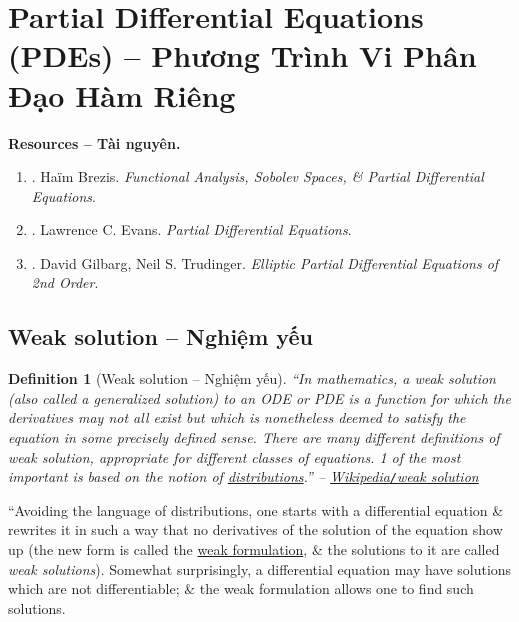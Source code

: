 \documentclass{article}
\newtheorem{definition}{Definition}
\begin{document}

\section{Partial Differential Equations (PDEs) -- Phương Trình Vi Phân Đạo Hàm Riêng}
\textbf{\textsf{Resources -- Tài nguyên.}}
\begin{enumerate}
	\item \cite{Brezis2011}. {\sc Ha\"im Brezis}. {\it Functional Analysis, Sobolev Spaces, \& Partial Differential Equations}.
	\item \cite{Evans2010}. {\sc Lawrence C. Evans}. {\it Partial Differential Equations}.
	\item \cite{Gilbarg_Trudinger2001}. {\sc David Gilbarg, Neil S. Trudinger}. {\it Elliptic Partial Differential Equations of 2nd Order}.
\end{enumerate}


\subsection{Weak solution -- Nghiệm yếu}

\begin{definition}[Weak solution -- Nghiệm yếu]
	``In mathematics, a \emph{weak solution} (also called a \emph{generalized solution}) to an ODE or PDE is a function for which the derivatives may not all exist but which is nonetheless deemed to satisfy the equation in some precisely defined sense. There are many different definitions of weak solution, appropriate for different classes of equations. 1 of the most important is based on the notion of \href{https://en.wikipedia.org/wiki/Distribution_(mathematics)}{distributions}.'' -- \href{https://en.wikipedia.org/wiki/Weak_solution}{Wikipedia{\tt/}weak solution}
\end{definition}
``Avoiding the language of distributions, one starts with a differential equation \& rewrites it in such a way that no derivatives of the solution of the equation show up (the new form is called the \href{https://en.wikipedia.org/wiki/Weak_formulation}{weak formulation}, \& the solutions to it are called {\it weak solutions}). Somewhat surprisingly, a differential equation may have solutions which are not differentiable; \& the weak formulation allows one to find such solutions.
\end{document}
